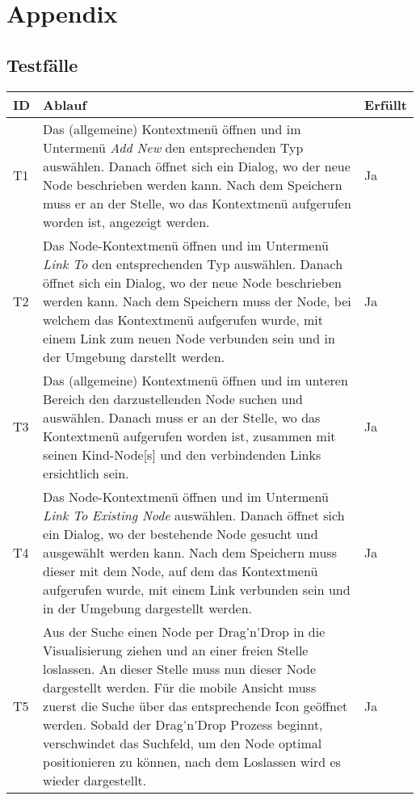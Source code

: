 \chapter{Appendix}

\section{Testfälle} \label{tests}

\begin{longtable}{|p{1cm} | p{10cm} |p{1.2cm} |}
  \hline
    ID & Ablauf & Erfüllt \\\hline
    T1 & Das (allgemeine) Kontextmenü öffnen und im Untermenü \textit{Add New} den entsprechenden Typ auswählen. Danach öffnet sich ein Dialog, wo der neue \gls{Node} beschrieben werden kann. Nach dem Speichern muss er an der Stelle, wo das Kontextmenü aufgerufen worden ist, angezeigt werden. & Ja \\\hline
    T2 & Das \gls{Node}-Kontextmenü öffnen und im Untermenü \textit{Link To} den entsprechenden Typ auswählen. Danach öffnet sich ein Dialog, wo der neue \gls{Node} beschrieben werden kann. Nach dem Speichern muss der Node, bei welchem das Kontextmenü aufgerufen wurde, mit einem Link zum neuen Node verbunden sein und in der Umgebung darstellt werden. & Ja \\\hline
    T3 & Das (allgemeine) Kontextmenü öffnen und im unteren Bereich den darzustellenden \gls{Node} suchen und auswählen. Danach muss er an der Stelle, wo das Kontextmenü aufgerufen worden ist, zusammen mit seinen Kind-\gls{Node}[s] und den verbindenden Links ersichtlich sein. & Ja\\\hline
    T4 & Das \gls{Node}-Kontextmenü öffnen und im Untermenü \textit{Link To} \textit{Existing Node} auswählen. Danach öffnet sich ein Dialog, wo der bestehende \gls{Node} gesucht und ausgewählt werden kann. Nach dem Speichern muss dieser mit dem Node, auf dem das Kontextmenü aufgerufen wurde, mit einem Link verbunden sein und in der Umgebung dargestellt werden. & Ja\\\hline
    T5 & Aus der Suche einen \gls{Node} per \gls{Drag'n'Drop}  in die Visualisierung ziehen und an einer freien Stelle loslassen. An dieser Stelle muss nun dieser \gls{Node} dargestellt werden. Für die mobile Ansicht muss zuerst die Suche über das entsprechende Icon geöffnet werden. Sobald der \gls{Drag'n'Drop} Prozess beginnt, verschwindet das Suchfeld, um den \gls{Node} optimal positionieren zu können, nach dem Loslassen wird es wieder dargestellt. & Ja \\\hline

\end{longtable}
